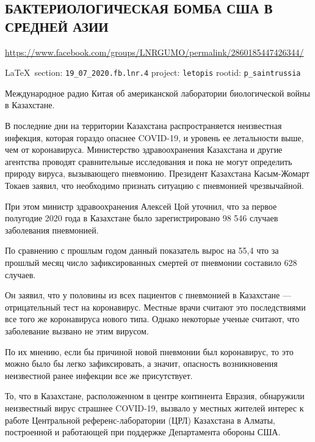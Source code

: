 
 
\subsection{БАКТЕРИОЛОГИЧЕСКАЯ БОМБА США В СРЕДНЕЙ АЗИИ}
\url{https://www.facebook.com/groups/LNRGUMO/permalink/2860185447426344/}
  
\vspace{0.5cm}
{\small\LaTeX~section: \verb|19_07_2020.fb.lnr.4| project: \verb|letopis| rootid: \verb|p_saintrussia|}
\vspace{0.5cm}


Международное радио Китая об американской лаборатории биологической войны в
Казахстане.

В последние дни на территории Казахстана распространяется неизвестная инфекция,
которая гораздо опаснее COVID-19, и уровень ее летальности выше, чем от
коронавируса. Министерство здравоохранения Казахстана и другие агентства
проводят сравнительные исследования и пока не могут определить природу вируса,
вызывающего пневмонию.  Президент Казахстана Касым-Жомарт Токаев заявил, что
необходимо признать ситуацию с пневмонией чрезвычайной.

При этом министр здравоохранения Алексей Цой уточнил, что за первое полугодие
2020 года в Казахстане было зарегистрировано 98 546 случаев заболевания
пневмонией.

По сравнению с прошлым годом данный показатель вырос на 55,4%
что за прошлый месяц число зафиксированных смертей от пневмонии составило 628
случаев.

Он заявил, что у половины из всех пациентов с пневмонией в Казахстане —
отрицательный тест на коронавирус.  Местные врачи считают это последствиями все
того же коронавируса нового типа. Однако некоторые ученые считают, что
заболевание вызвано не этим вирусом.

По их мнению, если бы причиной новой пневмонии был коронавирус, то это можно
было бы легко зафиксировать, а значит, опасность возникновения неизвестной
ранее инфекции все же присутствует.

То, что в Казахстане, расположенном в центре континента Евразия, обнаружили
неизвестный вирус страшнее COVID-19, вызвало у местных жителей интерес к работе
Центральной референс-лаборатории (ЦРЛ) Казахстана в Алматы, построенной и
работающей при поддержке Департамента обороны США.

